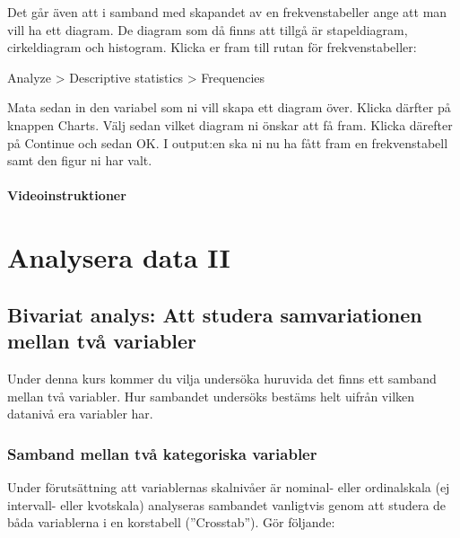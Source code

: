\documentclass[
]{book}
\begin{document}
Det går även att i samband med skapandet av en frekvenstabeller ange att man vill ha ett diagram. De diagram som då finns att tillgå är stapeldiagram, cirkeldiagram och histogram. Klicka er fram till rutan för frekvenstabeller:

Analyze \textgreater{} Descriptive statistics \textgreater{} Frequencies

Mata sedan in den variabel som ni vill skapa ett diagram över. Klicka därfter på knappen Charts. Välj sedan vilket diagram ni önskar att få fram. Klicka därefter på Continue och sedan OK. I output:en ska ni nu ha fått fram en frekvenstabell samt den figur ni har valt.

\hypertarget{videoinstruktioner-4}{%
\subsection{Videoinstruktioner}\label{videoinstruktioner-4}}

\hypertarget{part-analysera-data-ii}{%
\part*{Analysera data II}\label{part-analysera-data-ii}}

\hypertarget{bivariat-analys-att-studera-samvariationen-mellan-tvuxe5-variabler}{%
\chapter{Bivariat analys: Att studera samvariationen mellan två variabler}\label{bivariat-analys-att-studera-samvariationen-mellan-tvuxe5-variabler}}

Under denna kurs kommer du vilja undersöka huruvida det finns ett samband mellan två variabler. Hur sambandet undersöks bestäms helt uifrån vilken datanivå era variabler har.

\hypertarget{samband-mellan-tvuxe5-kategoriska-variabler}{%
\section{Samband mellan två kategoriska variabler}\label{samband-mellan-tvuxe5-kategoriska-variabler}}

Under förutsättning att variablernas skalnivåer är nominal- eller ordinalskala (ej intervall- eller
kvotskala) analyseras sambandet vanligtvis genom att studera de båda variablerna i en korstabell (''Crosstab''). Gör följande:
\end{document}
